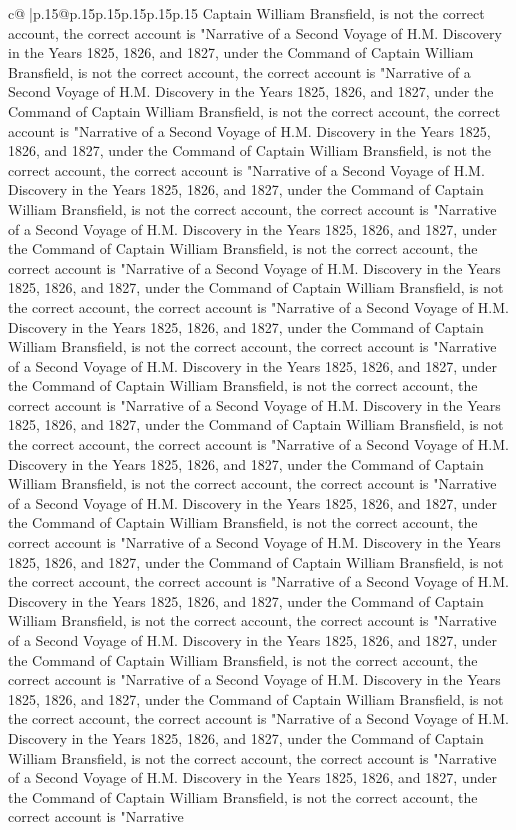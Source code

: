 \documentclass{article}
\begin{document}
{\begin{supertabular}{c@{$\;$}|p{.15\linewidth}@{}p{.15\linewidth}p{.15\linewidth}p{.15\linewidth}p{.15\linewidth}p{.15\linewidth}}
{{{Captain William Bransfield, is not the correct account, the correct account is "Narrative of a Second Voyage of H.M. Discovery in the Years 1825, 1826, and 1827, under the Command of Captain William Bransfield, is not the correct account, the correct account is "Narrative of a Second Voyage of H.M. Discovery in the Years 1825, 1826, and 1827, under the Command of Captain William Bransfield, is not the correct account, the correct account is "Narrative of a Second Voyage of H.M. Discovery in the Years 1825, 1826, and 1827, under the Command of Captain William Bransfield, is not the correct account, the correct account is "Narrative of a Second Voyage of H.M. Discovery in the Years 1825, 1826, and 1827, under the Command of Captain William Bransfield, is not the correct account, the correct account is "Narrative of a Second Voyage of H.M. Discovery in the Years 1825, 1826, and 1827, under the Command of Captain William Bransfield, is not the correct account, the correct account is "Narrative of a Second Voyage of H.M. Discovery in the Years 1825, 1826, and 1827, under the Command of Captain William Bransfield, is not the correct account, the correct account is "Narrative of a Second Voyage of H.M. Discovery in the Years 1825, 1826, and 1827, under the Command of Captain William Bransfield, is not the correct account, the correct account is "Narrative of a Second Voyage of H.M. Discovery in the Years 1825, 1826, and 1827, under the Command of Captain William Bransfield, is not the correct account, the correct account is "Narrative of a Second Voyage of H.M. Discovery in the Years 1825, 1826, and 1827, under the Command of Captain William Bransfield, is not the correct account, the correct account is "Narrative of a Second Voyage of H.M. Discovery in the Years 1825, 1826, and 1827, under the Command of Captain William Bransfield, is not the correct account, the correct account is "Narrative of a Second Voyage of H.M. Discovery in the Years 1825, 1826, and 1827, under the Command of Captain William Bransfield, is not the correct account, the correct account is "Narrative of a Second Voyage of H.M. Discovery in the Years 1825, 1826, and 1827, under the Command of Captain William Bransfield, is not the correct account, the correct account is "Narrative of a Second Voyage of H.M. Discovery in the Years 1825, 1826, and 1827, under the Command of Captain William Bransfield, is not the correct account, the correct account is "Narrative of a Second Voyage of H.M. Discovery in the Years 1825, 1826, and 1827, under the Command of Captain William Bransfield, is not the correct account, the correct account is "Narrative of a Second Voyage of H.M. Discovery in the Years 1825, 1826, and 1827, under the Command of Captain William Bransfield, is not the correct account, the correct account is "Narrative of a Second Voyage of H.M. Discovery in the Years 1825, 1826, and 1827, under the Command of Captain William Bransfield, is not the correct account, the correct account is "Narrative of a Second Voyage of H.M. Discovery in the Years 1825, 1826, and 1827, under the Command of Captain William Bransfield, is not the correct account, the correct account is "Narrative }}}
\end{supertabular}}
\end{document}
